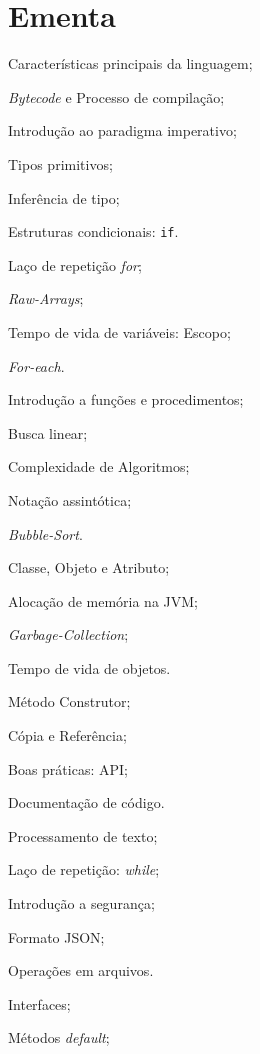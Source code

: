 \documentclass{article}
\begin{document}
\section{Ementa}
\begin{samepage}
\begin{itemize*}[label={}]
    \item[] Características principais da linguagem;
    \item[] \textit{Bytecode} e Processo de compilação;
    \item[] Introdução ao paradigma imperativo;
    \item[] Tipos primitivos;
    \item[] Inferência de tipo;
    \item[] Estruturas condicionais: \texttt{if}.
    \item[] Laço de repetição \textit{for};
    \item[] \textit{Raw-Arrays};
    \item[] Tempo de vida de variáveis: Escopo;
    \item[] \textit{For-each}.
    \item[] Introdução a funções e procedimentos;
    \item[] Busca linear;
    \item[] Complexidade de Algoritmos;
    \item[] Notação assintótica;
    \item[] \textit{Bubble-Sort}.
    \item[] Classe, Objeto e Atributo;
    \item[] Alocação de memória na JVM;
    \item[] \textit{Garbage-Collection};
    \item[] Tempo de vida de objetos.
    \item[] Método Construtor;
    \item[] Cópia e Referência;
    \item[] Boas práticas: API\@;
    \item[] Documentação de código.
    \item[] Processamento de texto;
    \item[] Laço de repetição: \textit{while};
    \item[] Introdução a segurança;
    \item[] Formato JSON;
    \item[] Operações em arquivos.
    \item[] Interfaces;
    \item[] Métodos \textit{default};

\end{itemize*}
\end{samepage}
\end{document}
